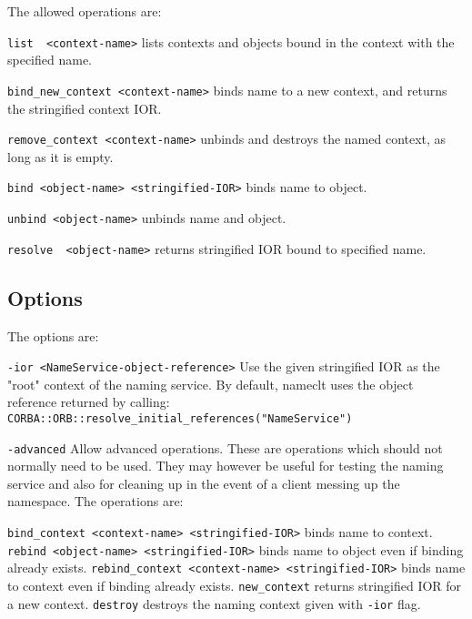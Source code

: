 \documentclass[11pt,twoside,onecolumn]{article}
\begin{document}
The allowed operations are:

\begin{description}
\item \verb.list  <context-name>.
  \subitem lists contexts and objects bound in the context with the specified name.
\item \verb.bind_new_context <context-name>.
  \subitem binds name to a new context, and returns the stringified context IOR.
\item \verb.remove_context <context-name>.
  \subitem unbinds and destroys the named context, as long as it is empty.
\item \verb.bind <object-name> <stringified-IOR>.
  \subitem binds name to object.
\item \verb.unbind <object-name>.
  \subitem unbinds name and object.
\item \verb.resolve  <object-name>.
  \subitem returns stringified IOR bound to specified name.

\end{description}


\subsection{Options}

The options are:

\begin{description}

\item \verb.-ior <NameService-object-reference>.
  \subitem  
Use the given stringified IOR as the "root" context of the naming service.  By
default, nameclt uses the object reference returned by calling: \\
\verb.CORBA::ORB::resolve_initial_references("NameService").

\item \verb.-advanced.
\subitem
Allow advanced operations.  These are operations which should not normally need
to be used.  They may however be useful for testing the naming service and also
for cleaning up in the event of a client messing up the namespace.  The
operations are:

\subitem \verb.bind_context <context-name> <stringified-IOR>.
\subsubitem binds name to context.
\subitem \verb.rebind <object-name> <stringified-IOR>.
\subsubitem binds name to object even if binding already exists.
\subitem \verb.rebind_context <context-name> <stringified-IOR>.
\subsubitem binds name to context even if binding already exists.
\subitem \verb.new_context.
\subsubitem returns stringified IOR for a new context.
\subitem \verb.destroy.
\subsubitem destroys the naming context given with \verb.-ior. flag.

\end{description}
\end{document}
